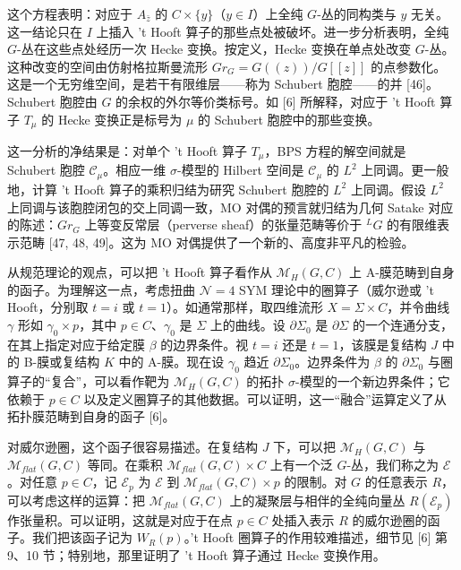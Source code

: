 \documentclass[11pt,a4paper,UTF8]{ctexart}
\begin{document}
这个方程表明：对应于 $A_{\bar z}$ 的 $C\times\{y\}$（$y\in I$）上全纯 $G$-丛的同构类与 $y$ 无关。这一结论只在 $I$ 上插入 't Hooft 算子的那些点处被破坏。进一步分析表明，全纯 $G$-丛在这些点处经历一次 Hecke 变换。按定义，Hecke 变换在单点处改变 $G$-丛。这种改变的空间由仿射格拉斯曼流形 $Gr_{G}=G((z))/G[[z]]$ 的点参数化。这是一个无穷维空间，是若干有限维层——称为 Schubert 胞腔——的并 [46]。Schubert 胞腔由 $G$ 的余权的外尔等价类标号。如 [6] 所解释，对应于 't Hooft 算子 $T_{\mu}$ 的 Hecke 变换正是标号为 $\mu$ 的 Schubert 胞腔中的那些变换。

这一分析的净结果是：对单个 't Hooft 算子 $T_{\mu}$，BPS 方程的解空间就是 Schubert 胞腔 $\mathcal{C}_{\mu}$。相应一维 $\sigma$-模型的 Hilbert 空间是 $\mathcal{C}_{\mu}$ 的 $L^{2}$ 上同调。更一般地，计算 't Hooft 算子的乘积归结为研究 Schubert 胞腔的 $L^{2}$ 上同调。假设 $L^{2}$ 上同调与该胞腔闭包的交上同调一致，MO 对偶的预言就归结为几何 Satake 对应的陈述：$Gr_{G}$ 上等变反常层（perverse sheaf）的张量范畴等价于 ${}^{L}G$ 的有限维表示范畴 [47, 48, 49]。这为 MO 对偶提供了一个新的、高度非平凡的检验。


从规范理论的观点，可以把 't Hooft 算子看作从 $\mathcal{M}_{H}(G,C)$ 上 A-膜范畴到自身的函子。为理解这一点，考虑扭曲 $\mathcal{N}=4$ SYM 理论中的圈算子（威尔逊或 't Hooft，分别取 $t=i$ 或 $t=1$）。如通常那样，取四维流形 $X=\Sigma\times C$，并令曲线 $\gamma$ 形如 $\gamma_{0}\times p$，其中 $p\in C$、$\gamma_{0}$ 是 $\Sigma$ 上的曲线。设 $\partial\Sigma_{0}$ 是 $\partial\Sigma$ 的一个连通分支，在其上指定对应于给定膜 $\beta$ 的边界条件。视 $t=i$ 还是 $t=1$，该膜是复结构 $J$ 中的 B-膜或复结构 $K$ 中的 A-膜。现在设 $\gamma_{0}$ 趋近 $\partial\Sigma_{0}$。边界条件为 $\beta$ 的 $\partial\Sigma_{0}$ 与圈算子的“复合”，可以看作靶为 $\mathcal{M}_{H}(G,C)$ 的拓扑 $\sigma$-模型的一个新边界条件；它依赖于 $p\in C$ 以及定义圈算子的其他数据。可以证明，这一“融合”运算定义了从拓扑膜范畴到自身的函子 [6]。


对威尔逊圈，这个函子很容易描述。在复结构 $J$ 下，可以把 $\mathcal{M}_{H}(G,C)$ 与 $\mathcal{M}_{flat}(G,C)$ 等同。在乘积 $\mathcal{M}_{flat}(G,C)\times C$ 上有一个泛 $G$-丛，我们称之为 $\mathcal{E}$。对任意 $p\in C$，记 $\mathcal{E}_{p}$ 为 $\mathcal{E}$ 到 $\mathcal{M}_{flat}(G,C)\times p$ 的限制。对 $G$ 的任意表示 $R$，可以考虑这样的运算：把 $\mathcal{M}_{flat}(G,C)$ 上的凝聚层与相伴的全纯向量丛 $R(\mathcal{E}_{p})$ 作张量积。可以证明，这就是对应于在点 $p\in C$ 处插入表示 $R$ 的威尔逊圈的函子。我们把该函子记为 $W_{R}(p)$。't Hooft 圈算子的作用较难描述，细节见 [6] 第 9、10 节；特别地，那里证明了 't Hooft 算子通过 Hecke 变换作用。
\end{document}
